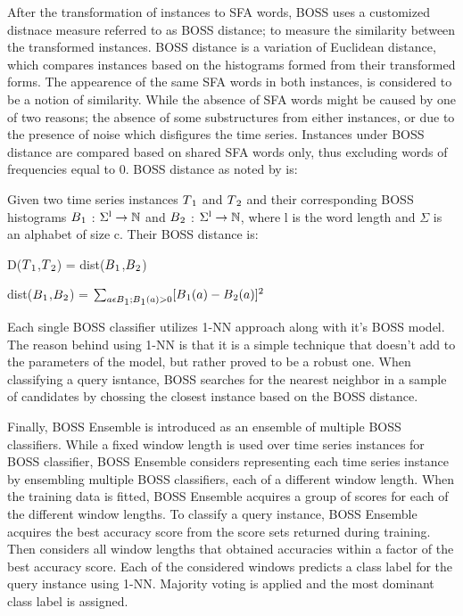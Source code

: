 After the transformation of instances to SFA words, BOSS uses a customized distnace measure referred to as BOSS distance; to measure the similarity between the transformed instances.
BOSS distance is a variation of Euclidean distance, which compares instances based on the histograms formed from their transformed forms. The appearence of the same SFA words in both
instances, is considered to be a notion of similarity. While the absence of SFA words might be caused by one of two reasons; the absence of some substructures from either instances,
or due to the presence of noise which disfigures the time series. Instances under BOSS distance are compared based on shared SFA words only, thus excluding words of frequencies equal to 0.
BOSS distance as noted by \cite{schafer2015boss} is:
\begin{definition}
    Given two time series instances $T\textsubscript{1}$ and $T\textsubscript{2}$ and their corresponding BOSS histograms $B\textsubscript{1}$ : $\Sigma\textsuperscript{l} \to \mathbb{N}$
    and $B\textsubscript{2}$ : $\Sigma\textsuperscript{l} \to \mathbb{N}$, where l is the word length and $\Sigma$ is an alphabet of size c. Their BOSS distance is:

    \centerline{D($T\textsubscript{1}$,$T\textsubscript{2}$) = dist($B\textsubscript{1}$,$B\textsubscript{2}$)}

    \centerline{dist($B\textsubscript{1}$,$B\textsubscript{2}$) = $\sum_{a \epsilon B\textsubscript{1};B\textsubscript{1}(a)>0}^{} [B\textsubscript{1}(a) - B\textsubscript{2}(a)]\textsuperscript{2}$}
\end{definition}

Each single BOSS classifier utilizes 1-NN approach along with it's BOSS model. The reason behind using 1-NN is that it is a simple technique 
that doesn't add to the parameters of the model, but rather proved to be a robust one. When classifying a query isntance, BOSS searches
for the nearest neighbor in a sample of candidates by chossing the closest instance based on the BOSS distance.

Finally, BOSS Ensemble is introduced as an ensemble of multiple BOSS classifiers. While a fixed window length is used over time series instances for BOSS classifier,
BOSS Ensemble considers representing each time series instance by ensembling multiple BOSS classifiers, each of a different window length.
When the training data is fitted, BOSS Ensemble acquires a group of scores for each of the different window lengths.
To classify a query instance, BOSS Ensemble acquires the best accuracy score from the score sets returned during training.
Then considers all window lengths that obtained accuracies within a factor of the best accuracy score.
Each of the considered windows predicts a class label for the query instance using 1-NN. Majority voting is applied and the most dominant
class label is assigned.